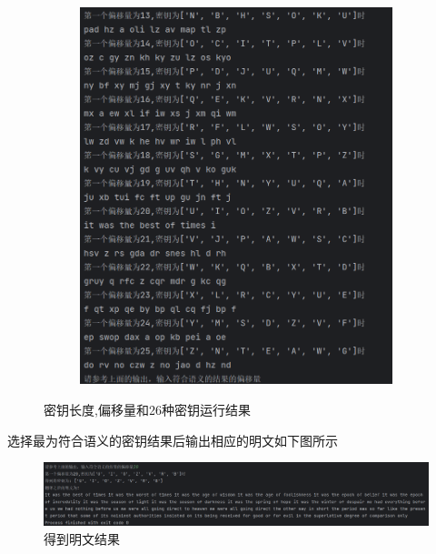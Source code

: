 \begin{figure}[htbp]
\begin{subfigure}[b]{0.5\textwidth}
                \includegraphics[width=\textwidth]{images/vigenere2_result_1.2.png}
                \label{fig:subfig2}
            \end{subfigure}
        
            \caption{密钥长度,偏移量和26种密钥运行结果}
            \label{fig:subfigures}
        \end{figure}

        选择最为符合语义的密钥结果后输出相应的明文如下图所示
        \begin{figure}[htbp] %
            \centering    %
            \includegraphics[width=18cm]{images/vigenere2_result1.3.png}  %
            \caption{得到明文结果}    %
            \label{pic1}        %
        \end{figure}
    \newpage
